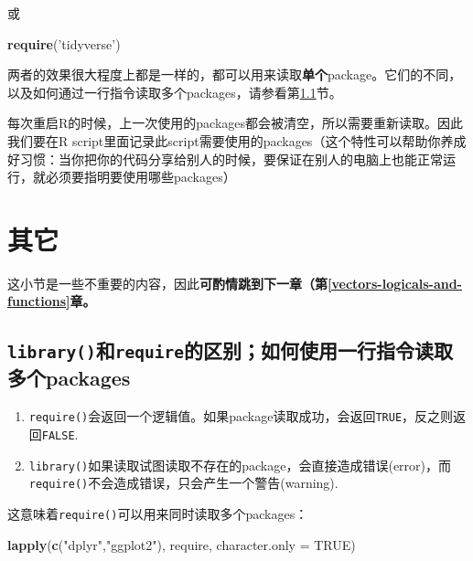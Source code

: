 \documentclass[]{book}
\newenvironment{Shaded}{\begin{snugshade}}{\end{snugshade}}
\newcommand{\DataTypeTok}[1]{\textcolor[rgb]{0.13,0.29,0.53}{#1}}
\newcommand{\KeywordTok}[1]{\textcolor[rgb]{0.13,0.29,0.53}{\textbf{#1}}}
\newcommand{\NormalTok}[1]{#1}
\newcommand{\OtherTok}[1]{\textcolor[rgb]{0.56,0.35,0.01}{#1}}
\newcommand{\StringTok}[1]{\textcolor[rgb]{0.31,0.60,0.02}{#1}}
\providecommand{\tightlist}{%
  \setlength{\itemsep}{0pt}\setlength{\parskip}{0pt}}
\begin{document}
或

\begin{Shaded}
\begin{Highlighting}[]
\KeywordTok{require}\NormalTok{(}\StringTok{'tidyverse'}\NormalTok{)}
\end{Highlighting}
\end{Shaded}

两者的效果很大程度上都是一样的，都可以用来读取\textbf{单个}package。它们的不同，以及如何通过一行指令读取多个packages，请参看第\ref{require-and-library}节。

每次重启R的时候，上一次使用的packages都会被清空，所以需要重新读取。因此我们要在R script里面记录此script需要使用的packages（这个特性可以帮助你养成好习惯：当你把你的代码分享给别人的时候，要保证在别人的电脑上也能正常运行，就必须要指明要使用哪些packages）

\section{其它}

这小节是一些不重要的内容，因此\textbf{可酌情跳到下一章（第\ref{vectors-logicals-and-functions}章。}

\hypertarget{require-and-library}{%
\subsection{\texorpdfstring{\texttt{library()}和\texttt{require}的区别；如何使用一行指令读取多个packages}{library()和require的区别；如何使用一行指令读取多个packages}}\label{require-and-library}}

\begin{enumerate}
\def\labelenumi{\arabic{enumi}.}
\tightlist
\item
  \texttt{require()}会返回一个逻辑值。如果package读取成功，会返回\texttt{TRUE}，反之则返回\texttt{FALSE}.
\item
  \texttt{library()}如果读取试图读取不存在的package，会直接造成错误(error)，而\texttt{require()}不会造成错误，只会产生一个警告(warning).
\end{enumerate}

这意味着\texttt{require()}可以用来同时读取多个packages：

\begin{Shaded}
\begin{Highlighting}[]
\KeywordTok{lapply}\NormalTok{(}\KeywordTok{c}\NormalTok{(}\StringTok{"dplyr"}\NormalTok{,}\StringTok{"ggplot2"}\NormalTok{), require, }\DataTypeTok{character.only =} \OtherTok{TRUE}\NormalTok{)}
\end{Highlighting}
\end{Shaded}
\end{document}
